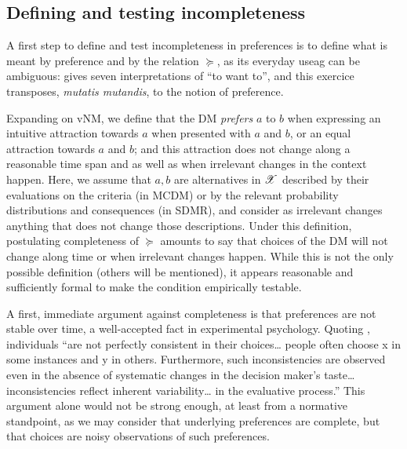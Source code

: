 \documentclass[french, english]{llncs}
\begin{document}

	\subsection{Defining and testing incompleteness}
	\label{sec:empirical}
	A first step to define and test incompleteness in preferences is to define what is meant by preference and by the relation $\succeq$, as its everyday useag can be ambiguous:\citet{frankfurt_freedom_1971} gives seven interpretations of “to want to”, and this exercice transposes, \emph{mutatis mutandis}, to the notion of preference.
	
	Expanding on vNM, we define that the \ac{DM} \emph{prefers} $a$ to $b$ when expressing an intuitive attraction towards $a$ when presented with $a$ and $b$, or an equal attraction towards $a$ and $b$; and this attraction does not change along a reasonable time span and as well as when irrelevant changes in the context happen. %
	Here, we assume that $a, b$ are alternatives in $\mathscr{X}$ described by their evaluations on the criteria (in MCDM) or by the relevant probability distributions and consequences (in SDMR), and consider as irrelevant changes anything that does not change those descriptions. 
	Under this definition, postulating completeness of $\succeq$ amounts to say that choices of the \ac{DM} will not change along time or when irrelevant changes happen. While this is not the only possible definition (others will be mentioned), it appears reasonable and sufficiently formal to make the condition empirically testable.
	
	A first, immediate argument against completeness is that preferences are not stable over time, a well-accepted fact in experimental psychology. Quoting \citet{tversky_intransitivity_1969}, individuals “are not perfectly consistent in their choices\ldots%
	people often choose x in some instances and y in others. Furthermore, such inconsistencies are observed even in the absence of systematic changes in the decision maker’s taste\ldots %
	inconsistencies reflect inherent variability\ldots %
	in the evaluative process.” This argument alone would not be strong enough, at least from a normative standpoint, as we may consider that underlying preferences are complete, but that choices are noisy observations of such preferences. 
	
\end{document}
